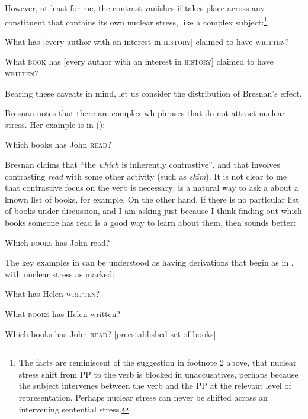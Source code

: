 \documentclass[output=paper]{LSP/langsci}
\begin{document}
However, at least for me, the contrast vanishes if  takes place across any constituent that contains its own nuclear stress, like a complex subject:\footnote{The facts are reminiscent of the suggestion in footnote 2 above, that nuclear stress shift from PP to the verb is blocked in unaccusatives, perhaps because the subject intervenes between the verb and the PP at the relevant level of representation.  Perhaps nuclear stress can never be shifted across an intervening sentential stress.}


\ea%
    \label{ex:richards:38}
  
\ea What has [every author with an interest in \textsc{history}]       claimed to have \textsc{written}?

\ex What \textsc{book} has [every author with an interest in \textsc{history}]       claimed to have \textsc{written}?
\z
\z

Bearing these caveats in mind, let us consider the distribution of Bresnan's effect.

 Bresnan notes that there are complex wh-phrases that do not attract nuclear stress.  Her example is in  (\citealt[259]{Bresnan1971}):


\ea%
    \label{ex:richards:39}
	  Which books has John \textsc{read}?
\z


Bresnan claims that ``the  \textit{which} is inherently contrastive'', and that  involves contrasting \textit{read} with some other activity (such as \textit{skim}).  It is not clear to me that contrastive focus on the verb is necessary;  is a natural way to ask a  about a known list of books, for example.  On the other hand, if there is no particular list of books under discussion, and I am asking just because I think finding out which books someone has read is a good way to learn about them, then  sounds better:


\ea%
    \label{ex:richards:40}
  	  Which \textsc{books} has John read?  
\z


  The key examples in  can be understood as having derivations that begin as in , with nuclear stress as marked:


\ea%
    \label{ex:richards:41}
  
\ea What has Helen \textsc{written}?

\ex What \textsc{books} has Helen written?

\ex Which books has John \textsc{read}?    [preestablished set of books]
\end{document}

